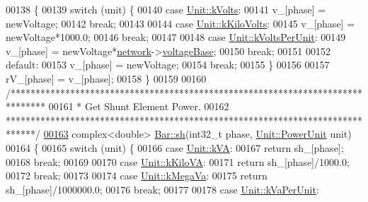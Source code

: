 \begin{DoxyCode}
00138 \{
00139   \textcolor{keywordflow}{switch} (unit) \{
00140   \textcolor{keywordflow}{case} \hyperlink{class_unit_a55b07dfa9457e1eca2c7194fe0cfc3c1aa54b2473993a702a3923525765bd6e4c}{Unit::kVolts}:
00141     v\_[phase] = newVoltage;
00142     \textcolor{keywordflow}{break};
00143 
00144   \textcolor{keywordflow}{case} \hyperlink{class_unit_a55b07dfa9457e1eca2c7194fe0cfc3c1a35a201a658c2cd89766787c657e9a54d}{Unit::kKiloVolts}:
00145     v\_[phase] = newVoltage*1000.0;
00146     \textcolor{keywordflow}{break};
00147 
00148   \textcolor{keywordflow}{case} \hyperlink{class_unit_a55b07dfa9457e1eca2c7194fe0cfc3c1ab44b1310b59fdcdc9df5bbea91da4206}{Unit::kVoltsPerUnit}:
00149     v\_[phase] = newVoltage*\hyperlink{class_bar_a80025f13884750add58cc61b318357ff}{network}->\hyperlink{group___graphics_ga7c1e79d9ac69df9a69f24eaf092fd5e5}{voltageBase};
00150     \textcolor{keywordflow}{break};
00151 
00152   \textcolor{keywordflow}{default}:
00153     v\_[phase] = newVoltage;
00154     \textcolor{keywordflow}{break};
00155   \}
00156 
00157   rV\_[phase] = v\_[phase];
00158 \}
00159 
00160 \textcolor{comment}{/*******************************************************************************}
00161 \textcolor{comment}{ * Get Shunt Element Power.}
00162 \textcolor{comment}{ ******************************************************************************/}
\hypertarget{bar_8cpp_source_l00163}{}\hyperlink{group___models_gac188071bf5f165b0acdaa4c8af82355c}{00163} complex<double> \hyperlink{group___models_gac188071bf5f165b0acdaa4c8af82355c}{Bar::sh}(int32\_t phase, \hyperlink{class_unit_ace265ae255370ccacfd5370337572c3b}{Unit::PowerUnit} unit)
00164 \{
00165   \textcolor{keywordflow}{switch} (unit) \{
00166   \textcolor{keywordflow}{case} \hyperlink{class_unit_ace265ae255370ccacfd5370337572c3ba72b181a842ae2759488a2fa1410d3696}{Unit::kVA}:
00167     \textcolor{keywordflow}{return} sh\_[phase];
00168     \textcolor{keywordflow}{break};
00169 
00170   \textcolor{keywordflow}{case} \hyperlink{class_unit_ace265ae255370ccacfd5370337572c3bac9e5154522fbb810d7aed75c3ff47cb2}{Unit::kKiloVA}:
00171     \textcolor{keywordflow}{return} sh\_[phase]/1000.0;
00172     \textcolor{keywordflow}{break};
00173 
00174   \textcolor{keywordflow}{case} \hyperlink{class_unit_ace265ae255370ccacfd5370337572c3ba6039da0ed20f8bee64305bab8bdec365}{Unit::kMegaVa}:
00175     \textcolor{keywordflow}{return} sh\_[phase]/1000000.0;
00176     \textcolor{keywordflow}{break};
00177 
00178   \textcolor{keywordflow}{case} \hyperlink{class_unit_ace265ae255370ccacfd5370337572c3bae056e80d620a87c61a44c359e6b05cc1}{Unit::kVaPerUnit}:

\end{DoxyCode}
